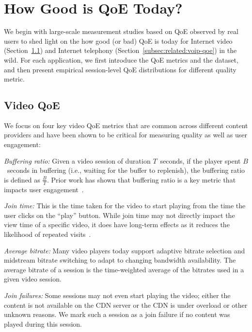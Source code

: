 \section{How Good is QoE Today?}
\label{sec:related:qoe}

We begin with large-scale measurement studies based on QoE observed 
by real users to shed light on the how good (or bad) QoE is today for 
Internet video (Section~\ref{subsec:related:video-qoe}) and Internet telephony 
(Section~\ref{subsec:related:voip-qoe}) in the wild. 
For each application, we first introduce the QoE metrics 
and the dataset, and then present empirical session-level QoE distributions
for different quality metric.

\subsection{Video QoE}
\label{subsec:related:video-qoe}

We focus on  four key video QoE metrics that are common across 
different  content providers and have been shown to be
 critical for measuring quality as well as user  engagement: 
\begin{packedenumerate}

\item \emph{Buffering ratio:}  Given a video session of 
duration $T$~seconds,  if the player spent $B$~seconds in 
buffering (i.e., waiting for the 
 buffer to replenish), the buffering ratio is defined as 
 $\frac{B}{T}$. 
 Prior work has shown that buffering ratio is a key metric
 that impacts user engagement~\cite{sigcomm11}.

\item \emph{Join time:}  This is the time taken for the video 
to start playing  from the time the user clicks on the ``play'' 
button. 
While join time may not directly impact the view time of a 
specific video,
it does have long-term effects as it reduces the likelihood 
of repeated visits~\cite{sigcomm11,akamai-imc12}.  
 

\item \emph{Average bitrate:} 
Many video players today support adaptive bitrate
selection and midstream bitrate switching to adapt to 
changing bandwidth availability. 
The average bitrate of a session is the time-weighted
average of the bitrates used in a given video session. 


\item \emph{Join failures:}   Some sessions may not even 
start playing the video; either the content is not available
 on the CDN server or the CDN is under overload or other 
unknown reasons. We mark such a session as a join failure
if no content was played during this session.

\end{packedenumerate}


